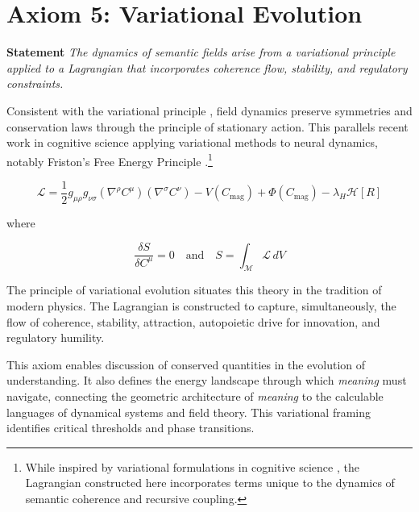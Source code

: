
\section{Axiom 5: Variational Evolution}
\label{1.5:axiom_5_variational_evolution}

\textbf{Statement} \textit{The dynamics of semantic fields arise from a variational principle applied to a Lagrangian that incorporates coherence flow, stability, and regulatory constraints.}

Consistent with the variational principle \autocite{GoldsteinPooleSafko2002, Arnold1989}, field dynamics preserve symmetries and conservation laws through the principle of stationary action. This parallels recent work in cognitive science applying variational methods to neural dynamics, notably Friston's Free Energy Principle \autocite{Friston2010, Parr2022}.\footnote{While inspired by variational formulations in cognitive science \autocite{Friston2010, Parr2022}, the Lagrangian constructed here incorporates terms unique to the dynamics of semantic coherence and recursive coupling.}

\begin{equation}
\mathcal{L} = \frac{1}{2} g_{\mu\rho} g_{\nu\sigma} (\nabla^\rho C^\mu)(\nabla^\sigma C^\nu) - V(C_{\text{mag}}) + \Phi(C_{\text{mag}}) - \lambda_H \mathcal{H}[R]
\end{equation}

where

\begin{equation}
\frac{\delta S}{\delta C^\mu} = 0 \quad \text{and} \quad S = \int_{\mathcal{M}} \mathcal{L} \, dV
\end{equation}

The principle of variational evolution situates this theory in the tradition of modern physics. The Lagrangian is constructed to capture, simultaneously, the flow of coherence, stability, attraction, autopoietic drive for innovation, and regulatory humility.

This axiom enables discussion of conserved quantities in the evolution of understanding. It also defines the energy landscape through which \textit{meaning} must navigate, connecting the geometric architecture of \textit{meaning} to the calculable languages of dynamical systems and field theory. This variational framing identifies critical thresholds and phase transitions.

